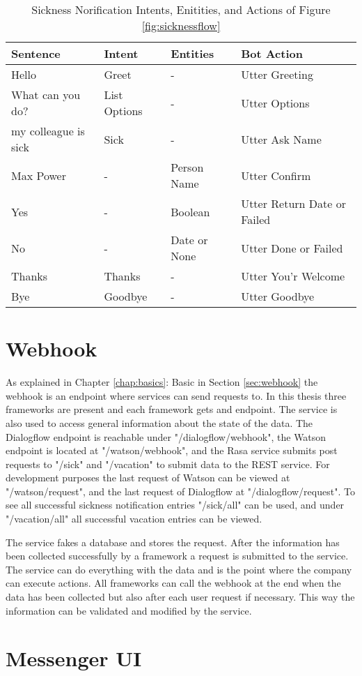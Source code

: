 \begin{table}[h]
    \centering
    \begin{tabular}{ l || l | l | l }
        Sentence & Intent & Entities & Bot Action \\ \hline \hline
        Hello & Greet & - & Utter Greeting \\ \hline
        What can you do? & List Options & - & Utter Options \\ \hline
        my colleague is sick & Sick & - & Utter Ask Name \\ \hline
        Max Power & - & Person Name & Utter Confirm \\ \hline
        Yes & - & Boolean & Utter Return Date or Failed \\ \hline
        No & - & Date or None & Utter Done or Failed \\ \hline
        Thanks & Thanks & - & Utter You'r Welcome \\ \hline
        Bye & Goodbye & - & Utter Goodbye \\ \hline
    \end{tabular}
    \caption{Sickness Norification Intents, Enitities, and Actions of Figure \ref{fig:sicknessflow}} \label{tab:sick_data}
\end{table} \noindent
\section{Webhook}
As explained in Chapter \ref{chap:basics}: Basic in Section \ref{sec:webhook} 
the webhook is an endpoint where services can send requests to.
In this thesis three frameworks are present and each framework gets and endpoint.
The service is also used to access general information about the state of the data.
The Dialogflow endpoint is reachable under "/dialogflow/webhook",
the Watson endpoint is located at "/watson/webhook",
and the Rasa service submits post requests to "/sick" and "/vacation" to submit data 
to the REST service.
For development purposes the last request of Watson can be viewed at "/watson/request",
and the last request of Dialogflow at "/dialogflow/request".
To see all successful sickness notification entries "/sick/all" can be used,
and under "/vacation/all" all successful vacation entries can be viewed.

The service fakes a database and stores the request.
After the information has been collected successfully by a framework a 
request is submitted to the service.
The service can do everything with the data and is the point where the company can execute actions.
All frameworks can call the webhook at the end when the data has been collected but also 
after each user request if necessary.
This way the information can be validated and modified by the service.

\section{Messenger UI}

